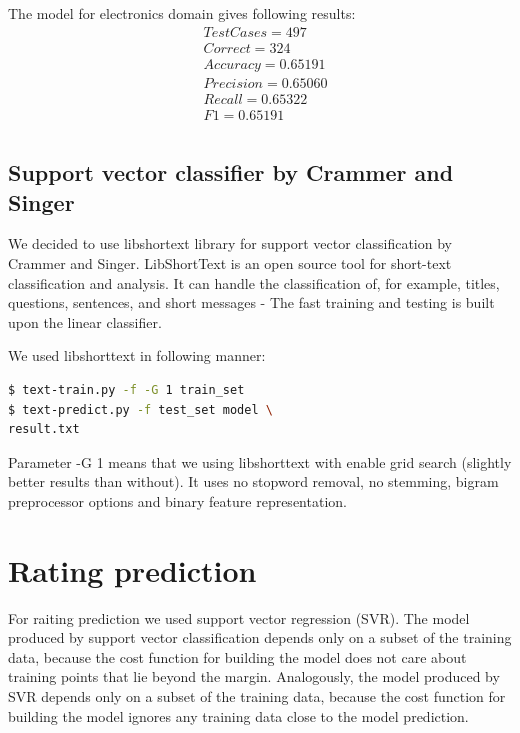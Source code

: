 \documentclass[10pt, a4paper]{article}
\begin{document}
The model for electronics domain gives following results:
\begin{equation}
\begin{split}
& Test Cases = 497 \\
& Correct = 324 \\
& Accuracy = 0.65191 \\
& Precision = 0.65060 \\
& Recall = 0.65322 \\
& F1 = 0.65191 \\
\end{split}
\end{equation}

\subsection{Support vector classifier by Crammer and Singer}

We decided to use libshortext library for support vector classification by Crammer and Singer. LibShortText is an open source tool for short-text classification and analysis. It can handle the classification of, for example, titles, questions, sentences, and short messages - The fast training and testing is built upon the linear classifier.

We used libshorttext in following manner:

\begin{lstlisting}[language=bash]
$ text-train.py -f -G 1 train_set
$ text-predict.py -f test_set model \
result.txt
\end{lstlisting}
Parameter -G 1 means that we using libshorttext with enable grid search (slightly better results than without). It uses no stopword removal, no stemming, bigram preprocessor options and binary feature representation.

\section{Rating prediction}

For raiting prediction we used support vector regression (SVR). The model produced by support vector classification depends only on a subset of the training data, because the cost function for building the model does not care about training points that lie beyond the margin. Analogously, the model produced by SVR depends only on a subset of the training data, because the cost function for building the model ignores any training data close to the model prediction.
\end{document}
